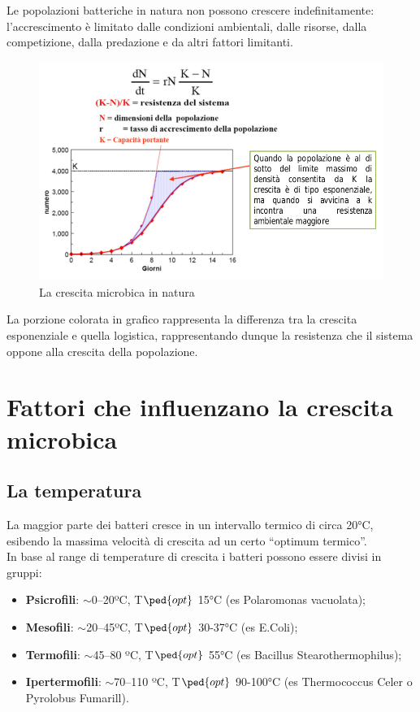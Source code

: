 \documentclass[11pt]{book}
\begin{document}
Le popolazioni batteriche in natura non possono crescere indefinitamente: l’accrescimento è limitato dalle condizioni ambientali, dalle risorse, dalla competizione, dalla predazione e da altri fattori limitanti.

\begin{figure}[htp]
\centering
\includegraphics[scale=0.4]{img/Crescita in natura.png}
\caption{La crescita microbica in natura}
\label{}
\end{figure}

La porzione colorata in grafico rappresenta la differenza tra la crescita esponenziale e quella logistica, rappresentando dunque la resistenza che il sistema oppone alla crescita della popolazione.

\clearpage
\section{Fattori che influenzano la crescita microbica}
\subsection{La temperatura}
La maggior parte dei batteri cresce in un intervallo termico di circa 20°C, esibendo la massima velocità di crescita ad un certo “optimum termico”.\\
In base al range di temperature di crescita i batteri possono essere divisi in gruppi:
\begin{itemize}
\item \textbf{Psicrofili}: $\sim$0–20ºC, T$\ped{opt}$ 15°C (es Polaromonas vacuolata);
\item \textbf{Mesofili}: $\sim$20–45ºC, T$\ped{opt}$ 30-37°C (es E.Coli);
\item \textbf{Termofili}: $\sim$45–80 ºC, T$\ped{opt}$ 55°C (es Bacillus Stearothermophilus);
\item \textbf{Ipertermofili}: $\sim$70–110 ºC, T$\ped{opt}$ 90-100°C (es Thermococcus Celer o Pyrolobus Fumarill).
\end{itemize}
\end{document}
